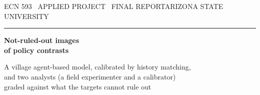 \begin{titlepage}
\thispagestyle{empty}
\setlength{\parskip}{0pt}
\raggedright

{\footnotesize\color{line}%
ECN 593 \textperiodcentered\ APPLIED PROJECT \textperiodcentered\ FINAL REPORT\hfill ARIZONA STATE UNIVERSITY\par}
\vspace{0.5em}
{\color{rule}\rule{\linewidth}{1.2pt}}
\vspace{1.2em}

{\fontsize{24}{29}\selectfont\bfseries\color{ink}%
Not-ruled-out images\\[0.15em]of policy contrasts\par}
\vspace{0.9em}
{\normalsize\color{line}%
A village agent-based model, calibrated by history matching,\\
and two analysts (a field experimenter and a calibrator)\\
graded against what the targets cannot rule out\par}

\vspace{1.2em}


\end{titlepage}

